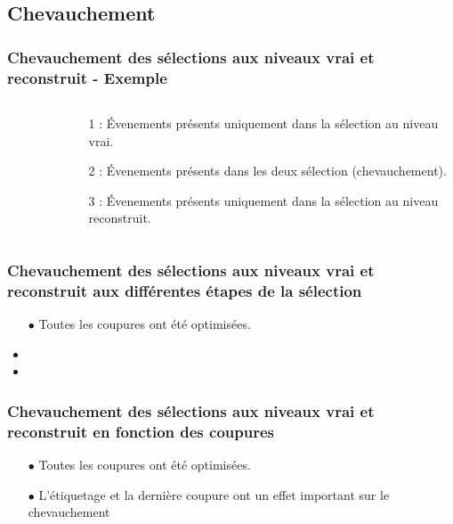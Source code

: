 \documentclass[usepdftitle=false,green]{beamer}
\begin{document}
	\subsection{Chevauchement}
\begin{frame}
	\frametitle{Chevauchement des sélections aux niveaux vrai et reconstruit - Exemple}
	\begin{columns}
		\begin{column}{8cm}
			\vspace{-5ex}
			\begin{figure}
			\end{figure}
	\begin{figure}
		\vspace{-2ex}
		\hspace{3ex}
	\end{figure}
		\end{column}
		\begin{column}{4.5cm}
			\hspace{-15ex}	
			\begin{itemize}
				{\small
				\item 1 : \'Evenements présents uniquement dans la sélection au niveau vrai.
				\item 2 : \'Evenements présents dans les deux sélection (chevauchement).
				\item 3 : \'Evenements présents uniquement dans la sélection au niveau reconstruit.
				}
			\end{itemize}
		\end{column}
	\end{columns}
\end{frame}

\begin{frame}
	\frametitle{Chevauchement des sélections aux niveaux vrai et reconstruit aux différentes étapes de la sélection}
	\begin{figure}
	\end{figure}
	\begin{itemize}
		\item[$\bullet$] Toutes les coupures ont été optimisées.
		\item 
		\item
	\end{itemize}
\end{frame}
\begin{frame}[noframenumbering]
	\frametitle{Chevauchement des sélections aux niveaux vrai et reconstruit en fonction des coupures}
	\begin{figure}
	\end{figure}
	\begin{itemize}
		\item[$\bullet$] Toutes les coupures ont été optimisées.
		\item[$\bullet$] {\color{red} L'étiquetage et la dernière coupure ont un effet important sur le chevauchement}
	\end{itemize}
\end{frame}
\end{document}

